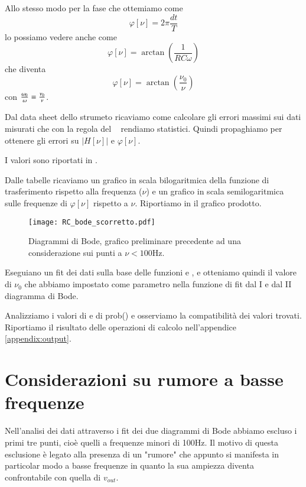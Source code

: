 \documentclass[
    rmp,
    reprint, 
    superscriptaddress, 
    altaffilletter, 
    amsmath, 
    amssymb, 
    a4paper]{revtex4-2}
\begin{document}
Allo stesso modo per la fase che ottemiamo come \[\varphi[\nu]=2\pi\frac{dt}{T}\] lo possiamo vedere anche come \[\varphi[\nu]=\arctan\left(\frac{1}{RC\omega}\right)\] che diventa \begin{equation} \varphi[\nu]=\arctan\left(\frac{\nu_0}{\nu}\right) \label{eqn:phi}\end{equation} con ${\omega_0\over\omega} = {\nu_0\over\nu}$.

Dal data sheet dello strumeto ricaviamo come calcolare gli errori massimi sui dati misurati che con la regola del \treSigma~ rendiamo statistici. Quindi propaghiamo per ottenere gli errori su $\left|H[\nu]\right|$ e $\varphi[\nu]$.

I valori sono riportati in .

Dalle tabelle ricaviamo un grafico in scala bilogaritmica della funzione di trasferimento rispetto alla frequenza ($\nu$) e un grafico in scala semilogaritmica sulle frequenze di $\varphi[\nu]$ rispetto a $\nu$. Riportiamo in  il grafico prodotto.

\begin{figure}
    \texttt{[image: RC\_bode\_scorretto.pdf]}
    \caption{Diagrammi di Bode, grafico preliminare precedente ad una considerazione sui punti a $\nu<100$Hz.}
    \label{fig:plot}
\end{figure}

Eseguiano un fit dei dati sulla base delle funzioni  e , e otteniamo quindi il valore di $\nu_0$ che abbiamo impostato come parametro nella funzione di fit dal I e dal II diagramma di Bode.

Analizziamo i valori di \ChiNdf e di prob(\ChiSqr) e osserviamo la compatibilità dei valori trovati. Riportiamo il risultato delle operazioni di calcolo nell'appendice \ref{appendix:output}.

\section{Considerazioni su rumore a basse frequenze}
Nell'analisi dei dati attraverso i fit dei due diagrammi di Bode abbiamo escluso i primi tre punti, cioè quelli a frequenze minori di 100Hz. Il motivo di questa esclusione è legato alla presenza di un "rumore" che appunto si manifesta in particolar modo a basse frequenze in quanto la sua ampiezza diventa confrontabile con quella di $v_{out}$.

\onecolumngrid
\appendix
\end{document}
